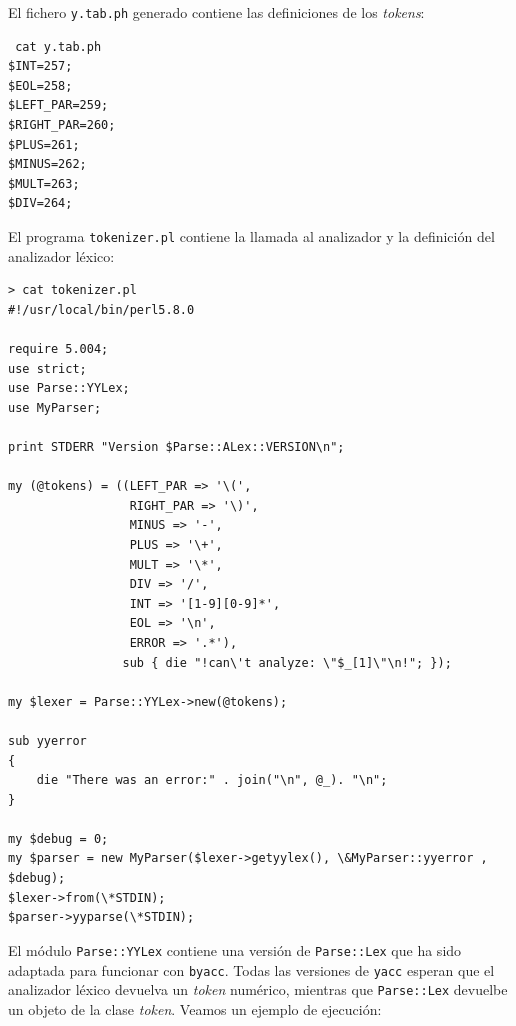 El fichero \verb|y.tab.ph| generado contiene las definiciones de los \emph{tokens}:
\begin{verbatim}
 cat y.tab.ph
$INT=257;
$EOL=258;
$LEFT_PAR=259;
$RIGHT_PAR=260;
$PLUS=261;
$MINUS=262;
$MULT=263;
$DIV=264;
\end{verbatim}
El programa \verb|tokenizer.pl| contiene la llamada al analizador 
y la definición del analizador léxico:
\begin{verbatim}
> cat tokenizer.pl
#!/usr/local/bin/perl5.8.0

require 5.004;
use strict;
use Parse::YYLex;
use MyParser;

print STDERR "Version $Parse::ALex::VERSION\n";

my (@tokens) = ((LEFT_PAR => '\(',
                 RIGHT_PAR => '\)',
                 MINUS => '-',
                 PLUS => '\+',
                 MULT => '\*',
                 DIV => '/',
                 INT => '[1-9][0-9]*',
                 EOL => '\n',
                 ERROR => '.*'),
                sub { die "!can\'t analyze: \"$_[1]\"\n!"; });

my $lexer = Parse::YYLex->new(@tokens);

sub yyerror
{
    die "There was an error:" . join("\n", @_). "\n";
}

my $debug = 0;
my $parser = new MyParser($lexer->getyylex(), \&MyParser::yyerror , $debug);
$lexer->from(\*STDIN);
$parser->yyparse(\*STDIN);
\end{verbatim}
El módulo \verb|Parse::YYLex| contiene una versión de \verb|Parse::Lex| 
que ha sido adaptada para funcionar con  \verb|byacc|. Todas las versiones de \verb|yacc| 
esperan que el analizador léxico devuelva un \emph{token} numérico, mientras que 
\verb|Parse::Lex| devuelbe un objeto de la clase \emph{token}.
Veamos un ejemplo de ejecución:
